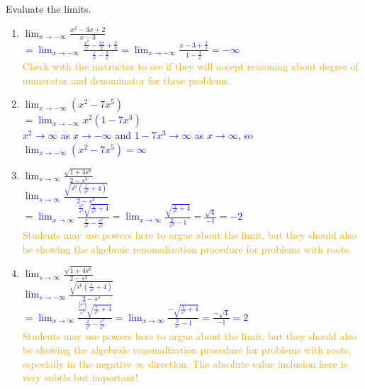 \documentclass{ximera}
\begin{document}
\begin{exercise}
    Evaluate the limits.\\
  \begin{enumerate}
    \item $\displaystyle\lim_{x\rightarrow -\infty}\frac{x^2-3x+2}{x-3}$\\
    \textcolor{blue}{$=\displaystyle \lim_{x\rightarrow -\infty} \frac{\frac{x^2}{x}-\frac{3x}{x}+\frac{2}{x}}{\frac{x}{x}-\frac{3}{x}}=\lim_{x\rightarrow -\infty} \frac{x-3+\frac{2}{x}}{1-\frac{3}{x}}=-\infty$}\\
    \textcolor{orange}{Check with the instructor to see if they will accept reasoning about degree of numerator and denominator for these problems.}
    
    \item $\displaystyle\lim_{x\rightarrow -\infty} (x^2-7x^5)$\\
    \textcolor{blue}{$=\displaystyle \lim_{x\rightarrow -\infty} x^2(1-7x^3)$\\
    $x^2\rightarrow \infty$ as $x\rightarrow -\infty$ and $1-7x^3\rightarrow \infty$ as $x\rightarrow \infty$, so $\displaystyle\lim_{x\rightarrow -\infty} (x^2-7x^5)=\infty$}
    
    \item $\displaystyle\lim_{s\rightarrow \infty}\frac{\sqrt{1+4s^6}}{2-s^3}$\\
    \textcolor{blue}{$\displaystyle\lim_{s\rightarrow \infty}\frac{\sqrt{s^6(\frac{1}{s^6}+4)}}{2-s^3}$\\
    $=\displaystyle \lim_{x\rightarrow \infty}\frac{\frac{s^3}{s^3}\sqrt{\frac{1}{s^6}+4}}{\frac{2}{s^3}-\frac{s^3}{s^3}}=\lim_{x\rightarrow \infty}\frac{\sqrt{\frac{1}{s^6}+4}}{\frac{2}{s^3}-1}=\frac{\sqrt{4}}{-1}=-2$}\\
    \textcolor{orange}{Students may use powers here to argue about the limit, but they should also be showing the algebraic renomalization procedure for problems with roots.}

     \item $\displaystyle\lim_{s\rightarrow \infty}\frac{\sqrt{1+4s^6}}{2-s^3}$\\
    \textcolor{blue}{$\displaystyle\lim_{s\rightarrow -\infty}\frac{\sqrt{s^6(\frac{1}{s^6}+4)}}{2-s^3}$\\
    $=\displaystyle \lim_{x\rightarrow \infty}\frac{\frac{|s^3|}{s^3}\sqrt{\frac{1}{s^6}+4}}{\frac{2}{s^3}-\frac{s^3}{s^3}}=\lim_{x\rightarrow \infty}\frac{-\sqrt{\frac{1}{s^6}+4}}{\frac{2}{s^3}-1}=\frac{-\sqrt{4}}{-1}=2$}\\
    \textcolor{orange}{Students may use powers here to argue about the limit, but they should also be showing the algebraic renomalization procedure for problems with roots, especially in the negative $\infty$ direction.  The absolute value inclusion here is very subtle but important!}
    

\end{enumerate}
\end{exercise}
\end{document}
